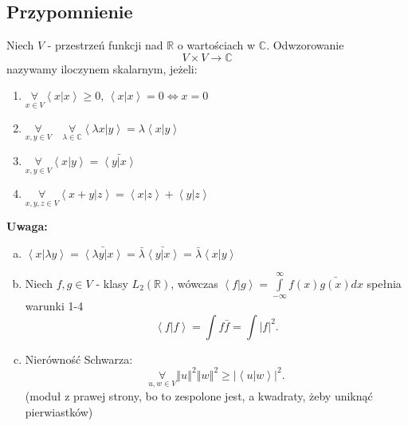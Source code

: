 \documentclass[../main.tex]{subfiles}
\begin{document}
    \subsection{Przypomnienie}
    Niech $V$ - przestrzeń funkcji nad $\mathbb{R}$ o wartościach w $\mathbb{C}$. Odwzorowanie
    \[
        V\times V\to \mathbb{C}
    \]
    nazywamy iloczynem skalarnym, jeżeli:
    \begin{enumerate}
        \item $\underset{x\in V}{\forall} \left<x | x \right> \ge 0$, $\left<x | x \right> = 0 \iff x = 0$
        \item $\underset{x,y\in V}{\forall} \quad \underset{\lambda\in \mathbb{C}}{\forall} \left<\lambda x | y \right> = \lambda \left<x|y \right>$
        \item $\underset{x,y\in V}{\forall} \left<x|y \right> = \bar{\left<y|x \right>}$
        \item $\underset{x,y,z\in V}{\forall} \left<x+y|z \right> = \left<x|z \right> + \left<y|z \right>$
    \end{enumerate}
    \textbf{Uwaga:}
    \begin{enumerate}[a)]
        \item $\left<x | \lambda y \right> = \bar{\left< \lambda y | x \right>} = \bar{\lambda} \bar{\left<y|x \right>} = \bar{\lambda}\left<x|y \right>$
        \item Niech $f, g\in V$ - klasy $L_2(\mathbb{R})$, wówczas $\left<f|g \right> = \int\limits_{-\infty}^{\infty} f(x)\bar{g(x)}dx $ spełnia warunki 1-4
            \[
                \left<f|f \right> = \int f \bar{f} = \int |f|^2
            .\]
    \item Nierówność Schwarza:
        \[
            \underset{u,w\in V}{\forall} \left\Vert u \right\Vert^2 \left\Vert w \right\Vert^2 \ge \left|\left<u|w \right>\right|^2
        .\]
    (moduł z prawej strony, bo to zespolone jest, a kwadraty, żeby uniknąć pierwiastków)
    \end{enumerate}
\end{document}
